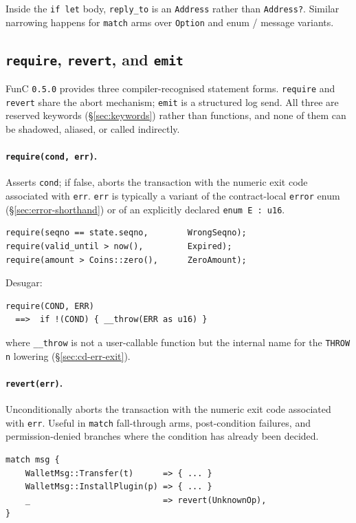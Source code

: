 \documentclass[12pt,oneside]{article}
\begin{document}
Inside the \verb|if let| body, \verb|reply_to| is an \verb|Address|
rather than \verb|Address?|. Similar narrowing happens for \verb|match|
arms over \verb|Option| and enum / message variants.

\subsection{\texttt{require}, \texttt{revert}, and \texttt{emit}}
\label{sec:require-emit}
FunC \verb|0.5.0| provides three compiler-recognised statement forms.
\verb|require| and \verb|revert| share the abort mechanism;
\verb|emit| is a structured log send. All three are reserved keywords
(\S\ref{sec:keywords}) rather than functions, and none of them can be
shadowed, aliased, or called indirectly.

\paragraph{\texttt{require(cond, err)}.}
Asserts \verb|cond|; if false, aborts the transaction with the numeric
exit code associated with \verb|err|. \verb|err| is typically a variant
of the contract-local \verb|error| enum (\S\ref{sec:error-shorthand})
or of an explicitly declared \verb|enum E : u16|.

\begin{verbatim}
require(seqno == state.seqno,        WrongSeqno);
require(valid_until > now(),         Expired);
require(amount > Coins::zero(),      ZeroAmount);
\end{verbatim}

Desugar:

\begin{verbatim}
require(COND, ERR)
  ==>  if !(COND) { __throw(ERR as u16) }
\end{verbatim}

where \verb|__throw| is not a user-callable function but the internal
name for the \verb|THROW n| lowering (\S\ref{sec:cd-err-exit}).

\paragraph{\texttt{revert(err)}.}
Unconditionally aborts the transaction with the numeric exit code
associated with \verb|err|. Useful in \verb|match| fall-through arms,
post-condition failures, and permission-denied branches where the
condition has already been decided.

\begin{verbatim}
match msg {
    WalletMsg::Transfer(t)      => { ... }
    WalletMsg::InstallPlugin(p) => { ... }
    _                           => revert(UnknownOp),
}
\end{verbatim}
\end{document}
